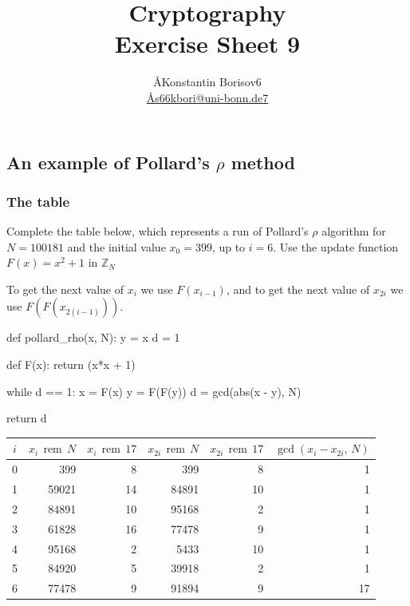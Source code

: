\documentclass{article}
\title{Cryptography \\ Exercise Sheet 9}
\author{
  \AA{Konstantin Borisov}{6} \\
  \href{mailto:\AA{s66kbori@uni-bonn.de}{7}}{\AA{s66kbori@uni-bonn.de}{7}}
}
\newcommand{\Z}{\mathbb{Z}}
\newcommand{\rem}{\,\operatorname{rem}\,}
\begin{document}
  \maketitle

  \setcounter{section}{9}
  \subsection{An example of Pollard's $\rho$ method}
  \subsubsection{The table}
  \begin{centerframebox}
    Complete the table below, which represents a run of Pollard's $\rho$ algorithm for
    $N = 100 181$ and the initial value $x_0 = 399$, up to $i = 6$. Use
    the update function $F(x) = x^2 + 1$ in $\Z_N$
  \end{centerframebox}
  To get the next value of $x_i$ we use $F(x_{i-1})$,
  and to get the next value of $x_{2i}$ we use $F(F(x_{2(i-1)}))$.

  \begin{mylisting}
    def pollard_rho(x, N):
      y = x
      d = 1

      def F(x):
        return (x*x + 1) %

      while d == 1:
        x = F(x)
        y = F(F(y))
        d = gcd(abs(x - y), N)

      return d
  \end{mylisting}

  \begin{center}
    \begin{tabular}{c|rrrrr}
      $i$ & $x_i \rem N$ & $x_i \rem 17$ & $x_{2i} \rem N$ & $x_{2i} \rem 17$ & $\gcd(x_i - x_{2i},\, N)$ \\\hline
      0 & 399 & 8 & 399 & 8 & 1 \\
      1 & 59021 & 14 & 84891 & 10 & 1 \\
      2 & 84891 & 10 & 95168 & 2 & 1 \\
      3 & 61828 & 16 & 77478 & 9 & 1 \\
      4 & 95168 & 2 & 5433 & 10 & 1 \\
      5 & 84920 & 5 & 39918 & 2 & 1 \\
      6 & 77478 & 9 & 91894 & 9 & 17
    \end{tabular}
  \end{center}
\end{document}

